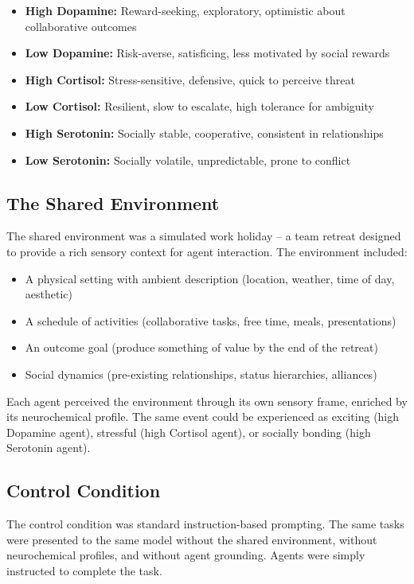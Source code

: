 \documentclass[11pt,a4paper]{article}
\begin{document}
\begin{itemize}
    \item \textbf{High Dopamine:} Reward-seeking, exploratory, optimistic about collaborative outcomes
    \item \textbf{Low Dopamine:} Risk-averse, satisficing, less motivated by social rewards
    \item \textbf{High Cortisol:} Stress-sensitive, defensive, quick to perceive threat
    \item \textbf{Low Cortisol:} Resilient, slow to escalate, high tolerance for ambiguity
    \item \textbf{High Serotonin:} Socially stable, cooperative, consistent in relationships
    \item \textbf{Low Serotonin:} Socially volatile, unpredictable, prone to conflict
\end{itemize}

\subsection{The Shared Environment}

The shared environment was a simulated work holiday -- a team retreat designed to provide a rich sensory context for agent interaction. The environment included:

\begin{itemize}
    \item A physical setting with ambient description (location, weather, time of day, aesthetic)
    \item A schedule of activities (collaborative tasks, free time, meals, presentations)
    \item An outcome goal (produce something of value by the end of the retreat)
    \item Social dynamics (pre-existing relationships, status hierarchies, alliances)
\end{itemize}

Each agent perceived the environment through its own sensory frame, enriched by its neurochemical profile. The same event could be experienced as exciting (high Dopamine agent), stressful (high Cortisol agent), or socially bonding (high Serotonin agent).

\subsection{Control Condition}

The control condition was standard instruction-based prompting. The same tasks were presented to the same model without the shared environment, without neurochemical profiles, and without agent grounding. Agents were simply instructed to complete the task.
\end{document}
